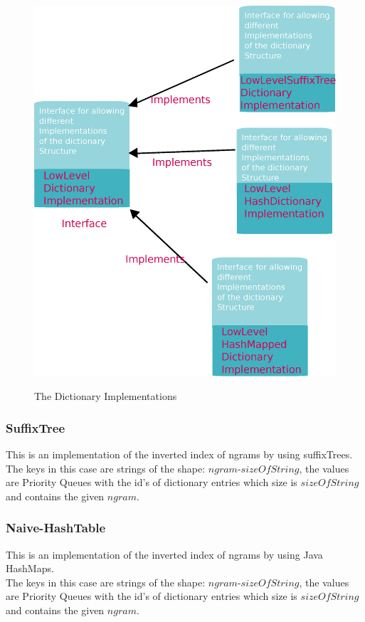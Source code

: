 \begin{figure}[h!]
  \caption{The Dictionary Implementations}
  \centering
    \includegraphics[scale=0.45]{graphics/dictionaryImplementations}
   \label{fig:dictionaryClasses}  
\end{figure}



\subsubsection{SuffixTree}  

This is an implementation of the inverted index of ngrams by using suffixTrees.\\
The keys in this case are strings of the shape: $ngram$-$sizeOfString$, the values are Priority Queues with the id's of dictionary entries which size is $sizeOfString$ and contains the given  $ngram$.

\subsubsection{Naive-HashTable}
 This is an implementation of the inverted index of ngrams by using Java HashMaps.\\
The keys in this case are strings of the shape: $ngram$-$sizeOfString$, the values are Priority Queues with the id's of dictionary entries which size is $sizeOfString$ and contains the given  $ngram$.
  
